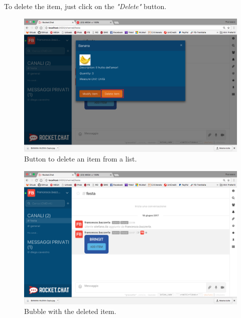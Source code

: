 To delete the item, just click on the \textit{"Delete"} button.

\begin{figure}[H]
  \centering 
  \includegraphics[width=\textwidth]{Sections/3-HowToUse/Images/popup_item_delete.png}
  \caption{Button to delete an item from a list.}
\end{figure}

\begin{figure}[H]
  \centering 
  \includegraphics[width=\textwidth]{Sections/3-HowToUse/Images/item_deleted.png}
  \caption{Bubble with the deleted item.}
\end{figure}